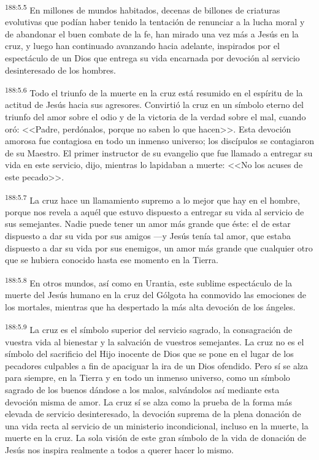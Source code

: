 \par 
\textsuperscript{188:5.5} En millones de mundos habitados, decenas de billones de criaturas evolutivas que podían haber tenido la tentación de renunciar a la lucha moral y de abandonar el buen combate de la fe, han mirado una vez más a Jesús en la cruz, y luego han continuado avanzando hacia adelante, inspirados por el espectáculo de un Dios que entrega su vida encarnada por devoción al servicio desinteresado de los hombres.

\par 
\textsuperscript{188:5.6} Todo el triunfo de la muerte en la cruz está resumido en el espíritu de la actitud de Jesús hacia sus agresores. Convirtió la cruz en un símbolo eterno del triunfo del amor sobre el odio y de la victoria de la verdad sobre el mal, cuando oró: <<Padre, perdónalos, porque no saben lo que hacen>>. Esta devoción amorosa fue contagiosa en todo un inmenso universo; los discípulos se contagiaron de su Maestro. El primer instructor de su evangelio que fue llamado a entregar su vida en este servicio, dijo, mientras lo lapidaban a muerte: <<No los acuses de este pecado>>.

\par 
\textsuperscript{188:5.7} La cruz hace un llamamiento supremo a lo mejor que hay en el hombre, porque nos revela a aquél que estuvo dispuesto a entregar su vida al servicio de sus semejantes. Nadie puede tener un amor más grande que éste: el de estar dispuesto a dar su vida por sus amigos ---y Jesús tenía tal amor, que estaba dispuesto a dar su vida por sus enemigos, un amor más grande que cualquier otro que se hubiera conocido hasta ese momento en la Tierra.

\par 
\textsuperscript{188:5.8} En otros mundos, así como en Urantia, este sublime espectáculo de la muerte del Jesús humano en la cruz del Gólgota ha conmovido las emociones de los mortales, mientras que ha despertado la más alta devoción de los ángeles.

\par 
\textsuperscript{188:5.9} La cruz es el símbolo superior del servicio sagrado, la consagración de vuestra vida al bienestar y la salvación de vuestros semejantes. La cruz no es el símbolo del sacrificio del Hijo inocente de Dios que se pone en el lugar de los pecadores culpables a fin de apaciguar la ira de un Dios ofendido. Pero sí se alza para siempre, en la Tierra y en todo un inmenso universo, como un símbolo sagrado de los buenos dándose a los malos, salvándolos así mediante esta devoción misma de amor. La cruz sí se alza como la prueba de la forma más elevada de servicio desinteresado, la devoción suprema de la plena donación de una vida recta al servicio de un ministerio incondicional, incluso en la muerte, la muerte en la cruz. La sola visión de este gran símbolo de la vida de donación de Jesús nos inspira realmente a todos a querer hacer lo mismo.

